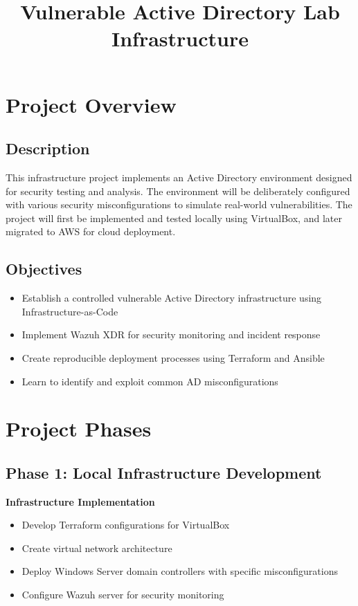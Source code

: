 \documentclass[11pt,a4paper]{article}
\title{\textbf{Vulnerable Active Directory Lab Infrastructure}}
\begin{document}
\maketitle

\section{Project Overview}
\subsection{Description}
This infrastructure project implements an Active Directory environment designed for security testing and analysis. The environment will be deliberately configured with various security misconfigurations to simulate real-world vulnerabilities. The project will first be implemented and tested locally using VirtualBox, and later migrated to AWS for cloud deployment.

\subsection{Objectives}
\begin{itemize}
    \item Establish a controlled vulnerable Active Directory infrastructure using Infrastructure-as-Code
    \item Implement Wazuh XDR for security monitoring and incident response
    \item Create reproducible deployment processes using Terraform and Ansible
    \item Learn to identify and exploit common AD misconfigurations
\end{itemize}

\section{Project Phases}

\subsection{Phase 1: Local Infrastructure Development}
\textbf{Infrastructure Implementation}
\begin{itemize}
    \item Develop Terraform configurations for VirtualBox
    \item Create virtual network architecture
    \item Deploy Windows Server domain controllers with specific misconfigurations
    \item Configure Wazuh server for security monitoring
\end{itemize}
\end{document}
